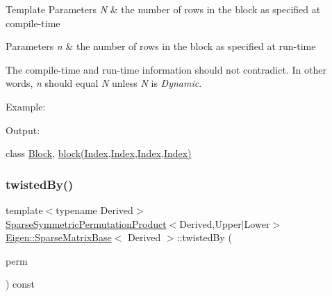 \begin{DoxyTemplParams}{Template Parameters}
{\em N} & the number of rows in the block as specified at compile-\/time \\
\hline
\end{DoxyTemplParams}

\begin{DoxyParams}{Parameters}
{\em n} & the number of rows in the block as specified at run-\/time\\
\hline
\end{DoxyParams}
The compile-\/time and run-\/time information should not contradict. In other words, {\itshape n} should equal {\itshape N} unless {\itshape N} is {\itshape Dynamic}.

Example\+: 
\begin{DoxyCodeInclude}{0}
\end{DoxyCodeInclude}
 Output\+: 
\begin{DoxyVerbInclude}
\end{DoxyVerbInclude}
 class \mbox{\hyperlink{class_eigen_1_1_block}{Block}}, \mbox{\hyperlink{class_eigen_1_1_sparse_matrix_base_a7c28a2f511181c727396d5e813519d38}{block(\+Index,\+Index,\+Index,\+Index)}} \mbox{\label{class_eigen_1_1_sparse_matrix_base_a51d4898bd6a57cc3ba543a39b102423e}} 
\subsubsection{\texorpdfstring{twistedBy()}{twistedBy()}}
{\footnotesize\ttfamily template$<$typename Derived$>$ \\
\mbox{\hyperlink{class_eigen_1_1_sparse_symmetric_permutation_product}{Sparse\+Symmetric\+Permutation\+Product}}$<$Derived,Upper$\vert$Lower$>$ \mbox{\hyperlink{class_eigen_1_1_sparse_matrix_base}{Eigen\+::\+Sparse\+Matrix\+Base}}$<$ Derived $>$\+::twisted\+By (\begin{DoxyParamCaption}\item[{const \mbox{\hyperlink{class_eigen_1_1_permutation_matrix}{Permutation\+Matrix}}$<$ Dynamic, Dynamic, \mbox{\hyperlink{class_eigen_1_1_sparse_matrix_base_a0b540ba724726ebe953f8c0df06081ed}{Storage\+Index}} $>$ \&}]{perm }\end{DoxyParamCaption}) const\hspace{0.3cm}{\ttfamily [inline]}}

